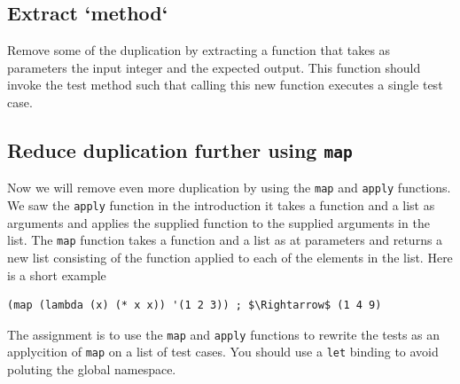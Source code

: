 \documentclass[12pt,a4paper,english,twoside]{article}
\begin{document}
\subsection{Extract `method`}
Remove some of the duplication by extracting a function that takes as 
parameters the input integer and the expected output. This function should 
invoke the test method such that calling this new function executes a 
single test case.
\subsection{Reduce duplication further using \texttt{map}}
Now we will remove even more duplication by using the \texttt{map} and 
\texttt{apply} functions. We saw the \texttt{apply} function in the 
introduction it takes a function and a list as arguments and applies the 
supplied function to the supplied arguments in the list. The \texttt{map} 
function takes a function and a list as at parameters and returns a new list 
consisting of the function applied to each of the elements in the list.
Here is a short example
\begin{lstlisting}
(map (lambda (x) (* x x)) '(1 2 3)) ; $\Rightarrow$ (1 4 9)
\end{lstlisting}
The assignment is to use the \texttt{map} and \texttt{apply} functions to 
rewrite the tests as an applycition of \texttt{map} on a list of test cases.
You should use a \texttt{let} binding to avoid poluting the global namespace.
 
\end{document}
